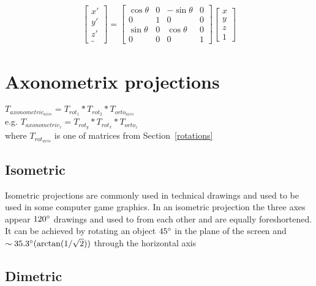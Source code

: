 \documentclass{article}
\begin{document}
\begin{gather}
		\begin{bmatrix}
		x'\\
		y'\\
		z'\\
		\_
	\end{bmatrix}
	=
	\begin{bmatrix}
		\cos \theta & 0 & -\sin \theta & 0\\
		0           & 1 & 0            & 0\\
		\sin \theta & 0 &  \cos \theta & 0\\
		0           & 0 & 0            & 1
	\end{bmatrix}
	\begin{bmatrix}
		x\\
		y\\
		z\\
		1
	\end{bmatrix}
\end{gather}

\clearpage
\section{Axonometrix projections}
$T_{axonometric_{axis}} = T_{rot_1} * T_{rot_2} * T_{orto_{axis}}$
\\
e.g. $T_{axonometric_z} = T_{rot_y} * T_{rot_x} * T_{orto_z}$
\\
where $T_{rot_{axis}}$ is one of matrices from Section~\ref{rotations}
\subsection{Isometric}
Isometric projections are commonly used in technical drawings and used to be used in some computer game graphics.
In an isometric projection the three axes appear $120\degree$ drawings and used to from each other and are equally foreshortened.
It can be achieved by rotating an object $45 \degree$ in the plane of the screen and $\sim 35.3 \degree (\arctan (1 / \sqrt 2))$ through the horizontal axis

\subsection{Dimetric}
\end{document}
